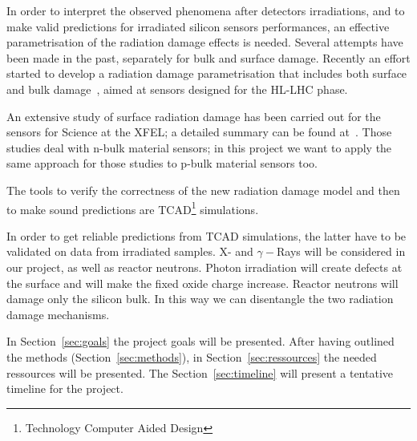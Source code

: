 \documentclass[dvips,12pt]{article}
\begin{document}
In order to interpret the observed phenomena after detectors irradiations,
 and to make valid predictions for irradiated silicon 
sensors performances, an effective parametrisation of the radiation damage effects is needed. 
Several attempts have been made in the past, separately for bulk and surface damage. 
Recently an effort started to develop a radiation damage parametrisation that includes both 
surface and bulk damage~\cite{Passeri2015}, aimed at sensors designed for the HL-LHC 
phase.

An extensive study of surface radiation damage has been carried out for the sensors 
for Science at the XFEL; a detailed summary can be found at~\cite{zhang-thesis}.
Those studies deal with n-bulk material sensors; in this project we want to apply the 
same approach for those studies to p-bulk material sensors too.

The tools to verify the correctness of the new radiation damage model and then to make 
sound predictions are TCAD\footnote{Technology Computer Aided Design} simulations. 

In order to get reliable predictions from TCAD simulations, the latter have to be validated 
on data from irradiated samples. X- and $\gamma-$Rays will be considered in our project, as 
well as reactor neutrons.
Photon irradiation will create defects at the surface and will make the fixed oxide charge increase. 
Reactor neutrons will damage only the silicon bulk. In this way we can disentangle the two 
radiation damage mechanisms.  

In Section~\ref{sec:goals} the project goals will be presented. After having outlined the methods 
(Section~\ref{sec:methods}), in Section~\ref{sec:ressources} the needed ressources will be 
presented. The Section~\ref{sec:timeline} will present a tentative timeline for the project. 
\end{document}
